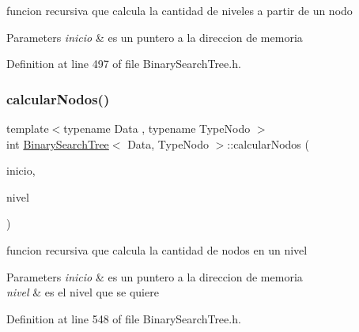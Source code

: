 funcion recursiva que calcula la cantidad de niveles a partir de un nodo 


\begin{DoxyParams}{Parameters}
{\em inicio} & es un puntero a la direccion de memoria \\
\hline
\end{DoxyParams}


Definition at line 497 of file Binary\+Search\+Tree.\+h.

\mbox{\label{class_binary_search_tree_adb25fc678a13dbaa05ba0c0627eb232e}} 
\subsubsection{\texorpdfstring{calcular\+Nodos()}{calcularNodos()}\hspace{0.1cm}{\footnotesize\ttfamily [1/2]}}
{\footnotesize\ttfamily template$<$typename Data , typename Type\+Nodo $>$ \\
int \hyperlink{class_binary_search_tree}{Binary\+Search\+Tree}$<$ Data, Type\+Nodo $>$\+::calcular\+Nodos (\begin{DoxyParamCaption}\item[{\hyperlink{class_class_node}{Class\+Node}$<$ Data $>$ $\ast$}]{inicio,  }\item[{int}]{nivel }\end{DoxyParamCaption})\hspace{0.3cm}{\ttfamily [inline]}}



funcion recursiva que calcula la cantidad de nodos en un nivel 


\begin{DoxyParams}{Parameters}
{\em inicio} & es un puntero a la direccion de memoria \\
\hline
{\em nivel} & es el nivel que se quiere \\
\hline
\end{DoxyParams}


Definition at line 548 of file Binary\+Search\+Tree.\+h.

\mbox{\label{class_binary_search_tree_adb25fc678a13dbaa05ba0c0627eb232e}} 
